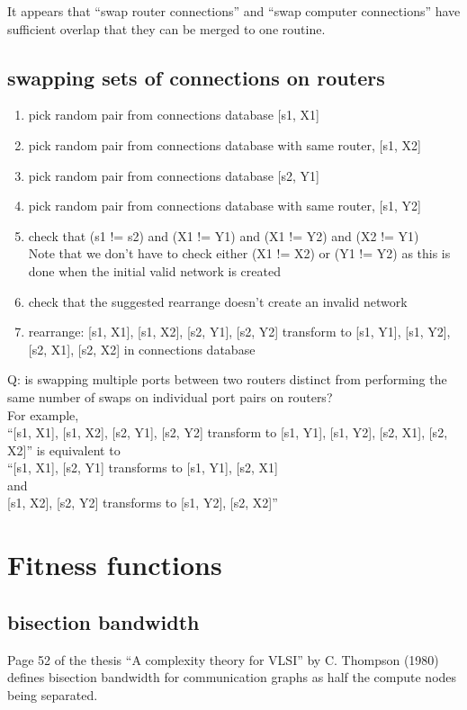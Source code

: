 \documentclass[pdftex]{article}
\begin{document}
It appears that ``swap router connections'' and ``swap computer connections'' have sufficient overlap that they can be merged to one routine.

\subsection{swapping sets of connections on routers}

\begin{enumerate}
 \item pick random pair from connections database {[}s1, X1]
 \item pick random pair from connections database with same router, {[}s1, X2]
 \item pick random pair from connections database {[}s2, Y1]
 \item pick random pair from connections database with same router, {[}s1, Y2]
 \item check that (s1 != s2) and  (X1 != Y1) and (X1 != Y2) and (X2 != Y1)\\
 Note that we don't have to check either (X1 != X2) or (Y1 != Y2) as this is done when the initial valid network is created
 \item check that the suggested rearrange doesn't create an invalid network 
 \item rearrange: {[}s1, X1], {[}s1, X2], {[}s2, Y1], {[}s2, Y2] transform to {[}s1, Y1], {[}s1, Y2], {[}s2, X1], {[}s2, X2] in connections database
\end{enumerate}

Q: is swapping multiple ports between two routers distinct from performing the same number of swaps on individual port pairs on routers?\\
For example,\\
``{[}s1, X1], {[}s1, X2], {[}s2, Y1], {[}s2, Y2] transform to {[}s1, Y1], {[}s1, Y2], {[}s2, X1], {[}s2, X2]'' is equivalent to\\
``{[}s1, X1], {[}s2, Y1] transforms to {[}s1, Y1], {[}s2, X1]\\
and\\
{[}s1, X2], {[}s2, Y2] transforms to {[}s1, Y2], {[}s2, X2]''

\section{Fitness functions}

\subsection{bisection bandwidth}
Page 52 of the thesis ``A complexity theory for VLSI'' by C. Thompson (1980) defines bisection bandwidth for communication graphs as half the compute nodes being separated.
\end{document}
